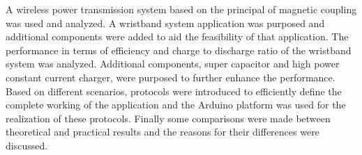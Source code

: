A wireless power transmission system based on the principal of magnetic coupling was used and analyzed. A wristband system application was purposed and additional components were added to aid the feasibility of that application. The performance in terms of efficiency and charge to discharge ratio of the wristband system was analyzed. Additional components, super capacitor and high power constant current charger, were purposed to further enhance the performance. Based on different scenarios, protocols were introduced to efficiently define the complete working of the application and the Arduino platform was used for the realization of these protocols. Finally some comparisons were made between theoretical and practical results and the reasons for their differences were discussed.